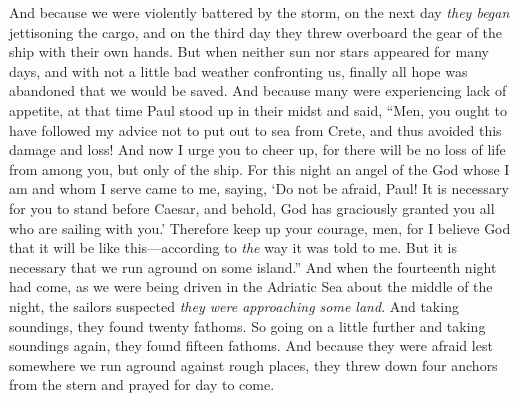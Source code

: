 \begin{biblechapter}
\verse And because we were violently battered by the storm, on the next day \textit{they began} jettisoning the cargo,
\verse and on the third day they threw overboard the gear of the ship with their own hands.
\verse But when neither sun nor stars appeared for many days, and with not a little bad weather confronting us, finally all hope was abandoned that we would be saved.
\verse And because many were experiencing lack of appetite, at that time Paul stood up in their midst and said, “Men, you ought to have followed my advice not to put out to sea from Crete, and thus avoided this damage and loss!
\verse And now I urge you to cheer up, for there will be no loss of life from among you, but only of the ship.
\verse For this night an angel of the God whose I am and whom I serve came to me,
\verse saying, ‘Do not be afraid, Paul! It is necessary for you to stand before Caesar, and behold, God has graciously granted you all who are sailing with you.’
\verse Therefore keep up your courage, men, for I believe God that it will be like this—according to \textit{the} way it was told to me.
\verse But it is necessary that we run aground on some island.”
\verse And when the fourteenth night had come, as we were being driven in the Adriatic Sea about the middle of the night, the sailors suspected \textit{they were approaching some land}.
\verse And taking soundings, they found twenty fathoms. So going on a little further and taking soundings again, they found fifteen fathoms.
\verse And because they were afraid lest somewhere we run aground against rough places, they threw down four anchors from the stern and prayed for day to come.

\end{biblechapter}
